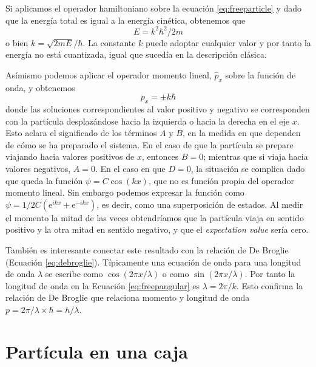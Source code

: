 Si aplicamos el operador hamiltoniano sobre la ecuación 
\ref{eq:freeparticle} y dado que la energía total es igual
a la energía cinética, obtenemos que 
\begin{equation}
E=k^2\hbar^2/2m
\end{equation}
o bien $k=\sqrt{2mE}/\hbar$. La constante $k$ puede adoptar
cualquier valor y por tanto la energía no está cuantizada,
igual que sucedía en la descripción clásica. 

Asímismo podemos aplicar el operador momento lineal, 
$\hat{p}_x$ sobre la función de onda, y obtenemos
\begin{equation}
    p_x = \pm k\hbar
\end{equation}
donde las soluciones correspondientes al valor positivo 
y negativo se corresponden con la partícula desplazándose
hacia la izquierda o hacia la derecha en el eje $x$. Esto
aclara el significado de los términos $A$ y $B$, en la
medida en que dependen de cómo se ha preparado el sistema.
En el caso de que la partícula se prepare viajando hacia
valores positivos de $x$, entonces $B=0$; mientras que si
viaja hacia valores negativos, $A=0$. En el caso en que
$D=0$, la situación se complica dado que queda la función
$\psi=C\cos(kx)$, que no es función propia del operador
momento lineal. Sin embargo podemos expresar la función como
$\psi=1/2C(\mathrm{e}^{ikx}+\mathrm{e}^{-ikx})$,
es decir, como una superposición de estados. Al medir el
momento la mitad de las veces obtendríamos que la partícula
viaja en sentido positivo y la otra mitad en sentido
negativo, y que el \textit{expectation value} sería cero.

También es interesante conectar este resultado 
con la relación de De Broglie (Ecuación
\ref{eq:debroglie}). Típicamente una ecuación de
onda para una longitud de onda $\lambda$ se
escribe como $\cos(2\pi x/\lambda)$ o como
$\sin(2\pi x/\lambda)$. Por tanto la longitud de
onda en la Ecuación \ref{eq:freepangular} es
$\lambda=2\pi/k$. Esto confirma la relación de 
De Broglie que relaciona momento y longitud de
onda $p=2\pi/\lambda\times\hbar=h/\lambda$.

\section{Partícula en una caja}
